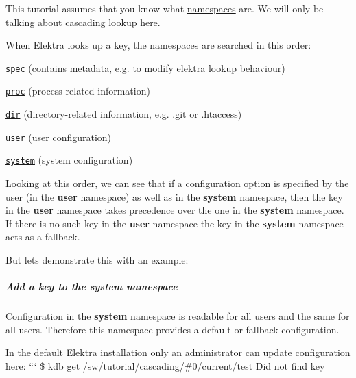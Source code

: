 This tutorial assumes that you know what \hyperlink{doc_tutorials_namespaces_md}{namespaces} are. We will only be talking about \hyperlink{md_doc_help_elektra-cascading_doc_help_elektra-cascading_md}{cascading lookup} here.

When Elektra looks up a key, the namespaces are searched in this order\+:


\begin{DoxyItemize}
\item \href{https://github.com/ElektraInitiative/libelektra/blob/master/doc/help/elektra-namespaces.md#spec}{\tt spec} (contains metadata, e.\+g. to modify elektra lookup behaviour)
\item \href{https://github.com/ElektraInitiative/libelektra/blob/master/doc/help/elektra-namespaces.md#proc}{\tt proc} (process-\/related information)
\item \href{https://github.com/ElektraInitiative/libelektra/blob/master/doc/help/elektra-namespaces.md#dir}{\tt dir} (directory-\/related information, e.\+g. {\ttfamily .git} or {\ttfamily .htaccess})
\item \href{https://github.com/ElektraInitiative/libelektra/blob/master/doc/help/elektra-namespaces.md#user}{\tt user} (user configuration)
\item \href{https://github.com/ElektraInitiative/libelektra/blob/master/doc/help/elektra-namespaces.md#system}{\tt system} (system configuration)
\end{DoxyItemize}

Looking at this order, we can see that if a configuration option is specified by the user (in the {\bfseries user} namespace) as well as in the {\bfseries system} namespace, then the key in the {\bfseries user} namespace takes precedence over the one in the {\bfseries system} namespace. If there is no such key in the {\bfseries user} namespace the key in the {\bfseries system} namespace acts as a fallback.

But lets demonstrate this with an example\+:

\subparagraph*{Add a key to the system namespace}

Configuration in the {\bfseries system} namespace is readable for all users and the same for all users. Therefore this namespace provides a default or fallback configuration.

In the default Elektra installation only an administrator can update configuration here\+: ``` \$ kdb get /sw/tutorial/cascading/\#0/current/test Did not find key

